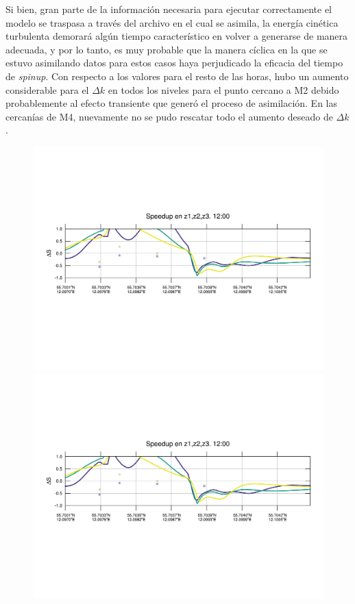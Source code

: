 Si bien, gran parte de la información necesaria para ejecutar correctamente el modelo se traspasa a través del archivo en el cual se asimila, la energía cinética turbulenta demorará algún tiempo característico en volver a generarse de manera adecuada, y por lo tanto, es muy probable que la manera cíclica en la que se estuvo asimilando datos para estos casos haya perjudicado la eficacia del tiempo de \emph{spinup}.
\newpage
Con respecto a los valores para el resto de las horas, hubo un aumento considerable para el $\Delta k$ en todos los niveles para el punto cercano a M2 debido probablemente al efecto transiente que generó el proceso de asimilación. En las cercanías de M4, nuevamente no se pudo rescatar todo el aumento deseado de $\Delta k$.
\vspace*{\fill}
\begin{figure}[H]
	\centering
	\includegraphics[width=0.95\linewidth,trim={12mm 84mm 10mm 74mm},page=1,clip]{Imagenes/06/bol_da/speedup}\\%
	\includegraphics[width=0.95\linewidth,trim={12mm 84mm 10mm 74mm},page=13,clip]{Imagenes/06/bol_da/speedup}\\%

\end{figure}
